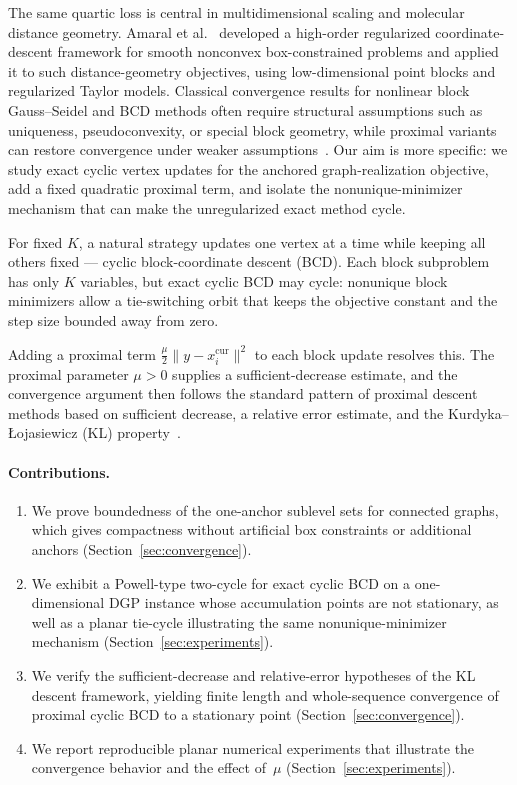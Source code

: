 \documentclass[11pt]{article}
\begin{document}
The same quartic loss is central in multidimensional scaling and molecular distance geometry.  Amaral et al.~\cite{amaral2022complexity} developed a high-order regularized coordinate-descent framework for smooth nonconvex box-constrained problems and applied it to such distance-geometry objectives, using low-dimensional point blocks and regularized Taylor models.  Classical convergence results for nonlinear block Gauss--Seidel and BCD methods often require structural assumptions such as uniqueness, pseudoconvexity, or special block geometry, while proximal variants can restore convergence under weaker assumptions~\cite{grippo2000convergence,tseng2001convergence,wright2015coordinate}.  Our aim is more specific: we study exact cyclic vertex updates for the anchored graph-realization objective, add a fixed quadratic proximal term, and isolate the nonunique-minimizer mechanism that can make the unregularized exact method cycle.

For fixed \(K\), a natural strategy updates one vertex at a time while keeping all others fixed — cyclic block-coordinate descent (BCD).  Each block subproblem has only \(K\) variables, but exact cyclic BCD may cycle: nonunique block minimizers allow a tie-switching orbit that keeps the objective constant and the step size bounded away from zero.

Adding a proximal term $\frac{\mu}{2}\|y-x_i^{\text{cur}}\|^2$ to each block update resolves this.  The proximal parameter $\mu>0$ supplies a sufficient-decrease estimate, and the convergence argument then follows the standard pattern of proximal descent methods based on sufficient decrease, a relative error estimate, and the Kurdyka--\L{}ojasiewicz (KL) property~\cite{attouch2010proximal,attouch2013convergence,bolte2014proximal}.

\paragraph{Contributions.}
\begin{enumerate}
    \item We prove boundedness of the one-anchor sublevel sets for connected graphs, which gives compactness without artificial box constraints or additional anchors (Section~\ref{sec:convergence}).
    \item We exhibit a Powell-type two-cycle for exact cyclic BCD on a one-dimensional DGP instance whose accumulation points are not stationary, as well as a planar tie-cycle illustrating the same nonunique-minimizer mechanism (Section~\ref{sec:experiments}).
    \item We verify the sufficient-decrease and relative-error hypotheses of the KL descent framework, yielding finite length and whole-sequence convergence of proximal cyclic BCD to a stationary point (Section~\ref{sec:convergence}).
    \item We report reproducible planar numerical experiments that illustrate the convergence behavior and the effect of~$\mu$ (Section~\ref{sec:experiments}).
\end{enumerate}
\end{document}

